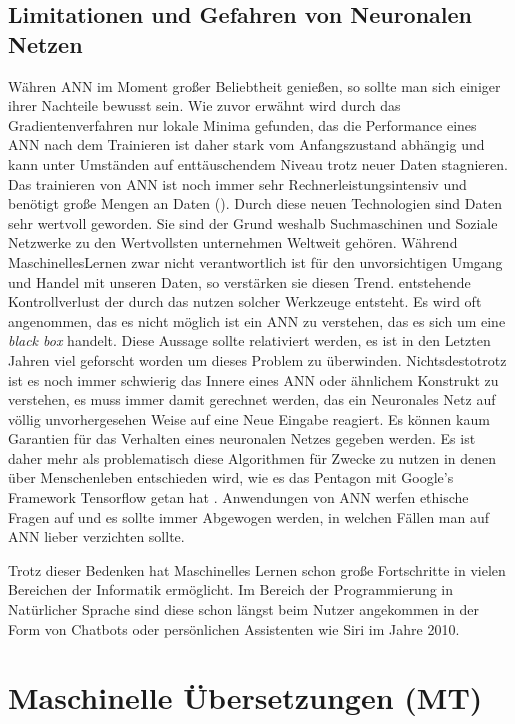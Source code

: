 \documentclass{thesisclass}
\begin{document}
\subsection{Limitationen und Gefahren von Neuronalen Netzen}
Währen \gls{ANN} im Moment großer Beliebtheit genießen, so sollte man sich einiger ihrer Nachteile bewusst sein. Wie zuvor erwähnt wird durch das Gradientenverfahren nur lokale Minima gefunden, das die Performance eines \gls{ANN} nach dem Trainieren ist daher stark vom Anfangszustand abhängig und kann unter Umständen auf enttäuschendem Niveau trotz neuer Daten stagnieren. Das trainieren von \gls{ANN} ist noch immer sehr Rechnerleistungsintensiv und benötigt große Mengen an Daten (). \newline Durch diese neuen Technologien sind Daten sehr wertvoll geworden. Sie sind der Grund weshalb Suchmaschinen und Soziale Netzwerke zu den Wertvollsten unternehmen Weltweit gehören. Während \gls{MaschinellesLernen} zwar nicht verantwortlich ist für den unvorsichtigen Umgang und Handel mit unseren Daten, so verstärken sie diesen Trend. entstehende Kontrollverlust der durch das nutzen solcher Werkzeuge entsteht. Es wird oft angenommen, das es nicht möglich ist ein \gls{ANN} zu verstehen, das es sich um eine \textit{black box} handelt. Diese Aussage sollte relativiert werden, es ist in den Letzten Jahren viel geforscht worden um dieses Problem zu überwinden\cite{lime}. Nichtsdestotrotz ist es noch immer schwierig das Innere eines \gls{ANN} oder ähnlichem Konstrukt zu verstehen, es muss immer damit gerechnet werden, das ein Neuronales Netz auf völlig unvorhergesehen Weise auf eine Neue Eingabe reagiert. Es können kaum Garantien für das Verhalten eines neuronalen Netzes gegeben werden. Es ist daher mehr als problematisch diese Algorithmen für Zwecke zu nutzen in denen über Menschenleben entschieden wird, wie es das Pentagon mit Google's Framework \gls{Tensorflow} getan hat \cite{gibbs_2018}. Anwendungen von \gls{ANN} werfen ethische Fragen auf und es sollte immer Abgewogen werden, in welchen Fällen man auf \gls{ANN} lieber verzichten sollte.

Trotz dieser Bedenken hat Maschinelles Lernen schon große Fortschritte in vielen Bereichen der Informatik ermöglicht. Im Bereich der Programmierung in Natürlicher Sprache sind diese schon längst beim Nutzer angekommen in der Form von Chatbots oder persönlichen Assistenten wie Siri im Jahre 2010.

\section{Maschinelle Übersetzungen (\gls{MT})}
\end{document}
